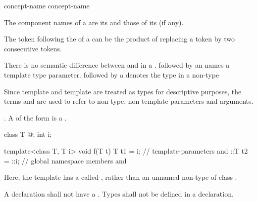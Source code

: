 \begin{bnf}
\br
  \br
\end{bnf}

\begin{bnf}
\br
   concept-name\br
   concept-name \terminal{<}  \terminal{>}
\end{bnf}

%
The component names of a  are
its  and
those of its  (if any).
\begin{note}
The \tcode{>} token following the
 of a
can be the product of replacing a
\tcode{>>} token by two consecutive \tcode{>}
tokens.
\end{note}

\pnum
There is no semantic difference between
and
in a
.
followed by an
names a template type parameter.
followed by a
denotes the type in a non-type
\begin{footnote}
Since template
and template
are treated as types for descriptive purposes, the terms
and
are used to refer to non-type, non-template parameters and arguments.
\end{footnote}
.
A  of the form
  is a .
\begin{example}
\begin{codeblock}
class T { @\commentellip@ };
int i;

template<class T, T i> void f(T t) {
  T t1 = i;         // template-parameters  and 
  ::T t2 = ::i;     // global namespace members  and 
}
\end{codeblock}
Here, the template  has a 
called , rather than an unnamed non-type
 of class .
\end{example}
A  declaration shall not
have a .
Types shall not be defined in a 
declaration.

